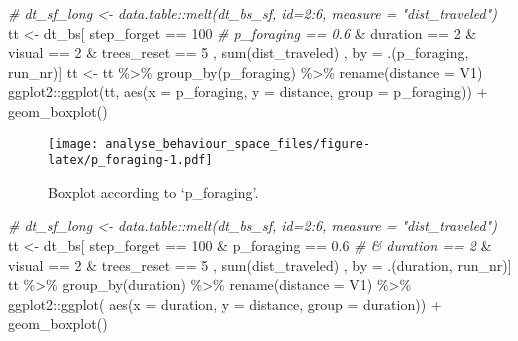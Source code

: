 \documentclass[
]{article}
\newenvironment{Shaded}{\begin{snugshade}}{\end{snugshade}}
\newcommand{\AttributeTok}[1]{\textcolor[rgb]{0.77,0.63,0.00}{#1}}
\newcommand{\CommentTok}[1]{\textcolor[rgb]{0.56,0.35,0.01}{\textit{#1}}}
\newcommand{\DecValTok}[1]{\textcolor[rgb]{0.00,0.00,0.81}{#1}}
\newcommand{\FloatTok}[1]{\textcolor[rgb]{0.00,0.00,0.81}{#1}}
\newcommand{\FunctionTok}[1]{\textcolor[rgb]{0.00,0.00,0.00}{#1}}
\newcommand{\NormalTok}[1]{#1}
\newcommand{\OtherTok}[1]{\textcolor[rgb]{0.56,0.35,0.01}{#1}}
\newcommand{\SpecialCharTok}[1]{\textcolor[rgb]{0.00,0.00,0.00}{#1}}
\begin{document}
\begin{Shaded}
\begin{Highlighting}[]
\CommentTok{\# dt\_sf\_long \textless{}{-} data.table::melt(dt\_bs\_sf, id=2:6, measure = "dist\_traveled")}
\NormalTok{tt }\OtherTok{\textless{}{-}}\NormalTok{ dt\_bs[ step\_forget }\SpecialCharTok{==} \DecValTok{100}
             \CommentTok{\#    p\_foraging == 0.6}
             \SpecialCharTok{\&}\NormalTok{ duration }\SpecialCharTok{==} \DecValTok{2}
             \SpecialCharTok{\&}\NormalTok{ visual }\SpecialCharTok{==} \DecValTok{2}
             \SpecialCharTok{\&}\NormalTok{ trees\_reset }\SpecialCharTok{==} \DecValTok{5}
\NormalTok{             , }\FunctionTok{sum}\NormalTok{(dist\_traveled) , by }\OtherTok{=}\NormalTok{ .(p\_foraging, run\_nr)]}
\NormalTok{tt }\OtherTok{\textless{}{-}}\NormalTok{ tt }\SpecialCharTok{\%\textgreater{}\%} \FunctionTok{group\_by}\NormalTok{(p\_foraging) }\SpecialCharTok{\%\textgreater{}\%} \FunctionTok{rename}\NormalTok{(}\AttributeTok{distance =}\NormalTok{ V1)}
\NormalTok{ggplot2}\SpecialCharTok{::}\FunctionTok{ggplot}\NormalTok{(tt, }\FunctionTok{aes}\NormalTok{(}\AttributeTok{x =}\NormalTok{ p\_foraging, }\AttributeTok{y =}\NormalTok{ distance, }\AttributeTok{group =}\NormalTok{ p\_foraging)) }\SpecialCharTok{+} \FunctionTok{geom\_boxplot}\NormalTok{()}
\end{Highlighting}
\end{Shaded}

\begin{figure}
\centering
\texttt{[image: analyse\_behaviour\_space\_files/figure-latex/p\_foraging-1.pdf]}
\caption{Boxplot according to `p\_foraging'.}
\end{figure}

\begin{Shaded}
\begin{Highlighting}[]
\CommentTok{\# dt\_sf\_long \textless{}{-} data.table::melt(dt\_bs\_sf, id=2:6, measure = "dist\_traveled")}
\NormalTok{tt }\OtherTok{\textless{}{-}}\NormalTok{ dt\_bs[ step\_forget }\SpecialCharTok{==} \DecValTok{100}
    \SpecialCharTok{\&}\NormalTok{ p\_foraging }\SpecialCharTok{==} \FloatTok{0.6}
\CommentTok{\#    \& duration == 2}
    \SpecialCharTok{\&}\NormalTok{ visual }\SpecialCharTok{==} \DecValTok{2}
    \SpecialCharTok{\&}\NormalTok{ trees\_reset }\SpecialCharTok{==} \DecValTok{5}
\NormalTok{    , }\FunctionTok{sum}\NormalTok{(dist\_traveled) , by }\OtherTok{=}\NormalTok{ .(duration, run\_nr)]}
\NormalTok{tt }\SpecialCharTok{\%\textgreater{}\%} \FunctionTok{group\_by}\NormalTok{(duration) }\SpecialCharTok{\%\textgreater{}\%} \FunctionTok{rename}\NormalTok{(}\AttributeTok{distance =}\NormalTok{ V1) }\SpecialCharTok{\%\textgreater{}\%} 
\NormalTok{ggplot2}\SpecialCharTok{::}\FunctionTok{ggplot}\NormalTok{( }\FunctionTok{aes}\NormalTok{(}\AttributeTok{x =}\NormalTok{ duration, }\AttributeTok{y =}\NormalTok{ distance, }\AttributeTok{group =}\NormalTok{ duration)) }\SpecialCharTok{+} \FunctionTok{geom\_boxplot}\NormalTok{()}
\end{Highlighting}
\end{Shaded}
\end{document}
